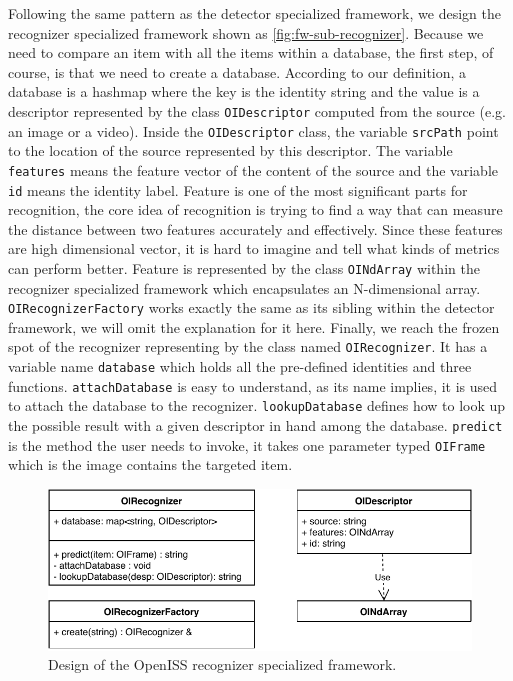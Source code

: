 Following the same pattern as the detector specialized framework, we design the
recognizer specialized framework shown as \autoref{fig:fw-sub-recognizer}.
Because we need to compare an item with all the items within a database, the
first step, of course, is that we need to create a database. According to our
definition, a database is a hashmap where the key is the identity string and
the value is a descriptor represented by the class \texttt{OIDescriptor}
computed from the source (e.g. an image or a video).
Inside the \texttt{OIDescriptor} class, the variable \texttt{srcPath} point to
the location of the source represented by this descriptor. The variable
\texttt{features} means the feature vector of the content of the source and the
variable \texttt{id} means the identity label.
Feature is one of the most significant parts for recognition, the core idea of
recognition is trying to find a way that can measure the distance between two
features accurately and effectively. Since these features are high dimensional
vector, it is hard to imagine and tell what kinds of metrics can perform better.
Feature is represented by the class \texttt{OINdArray} within the recognizer
specialized framework which encapsulates an N-dimensional array.
\texttt{OIRecognizerFactory} works exactly the same as its sibling within
the detector framework, we will omit the explanation for it here.
Finally, we reach the frozen spot of the recognizer representing by the class
named \texttt{OIRecognizer}. It has a variable name \texttt{database} which
holds all the pre-defined identities and three functions.
\texttt{attachDatabase} is easy to understand, as its name implies, it is used
to attach the database to the recognizer.
\texttt{lookupDatabase} defines how to look up the possible result
with a given descriptor in hand among the database.
\texttt{predict} is the method the user needs to invoke, it takes one parameter
typed \texttt{OIFrame} which is the image contains the targeted item.

\begin{figure}
    \centering
    \includegraphics[width=\linewidth]{figures/framework_sub_recognizer.pdf}
    \caption{Design of the OpenISS recognizer specialized framework.}
    \label{fig:fw-sub-recognizer}
\end{figure}

